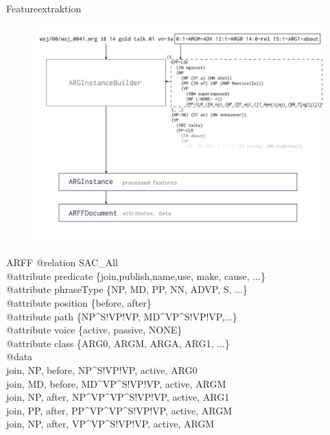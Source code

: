 \documentclass[10pt]{beamer}
\begin{document}
\begin{frame}{Featureextraktion} 
  \begin{figure}
	  \begin{center}
	  	\includegraphics[scale=0.5]{argext_graphic}
	  \end{center}
  \end{figure}
\end{frame}

\begin{frame}{ARFF}
	@relation SAC\_All \\
	\vspace{5pt}
	@attribute predicate \{join,publish,name,use, make, cause, ...\} \\
	@attribute phraseType \{NP, MD, PP, NN, ADVP, S, ...\} \\
	@attribute position \{before, after\} \\
	@attribute path \{NP\^{}S!VP!VP, MD\^{}VP\^{}S!VP!VP,...\} \\
	@attribute voice \{active, passive, NONE\} \\
	@attribute class \{ARG0, ARGM, ARGA, ARG1, ...\} \\
	\vspace{10pt}
	@data \\
	join, NP, before, NP\^{}S!VP!VP, active, ARG0 \\
	join, MD, before, MD\^{}VP\^{}S!VP!VP, active, ARGM \\
	join, NP, after, NP\^{}VP\^{}VP\^{}S!VP!VP, active, ARG1 \\
	join, PP, after, PP\^{}VP\^{}VP\^{}S!VP!VP, active, ARGM \\
	join, NP, after, VP\^{}VP\^{}S!VP!VP, active, ARGM \\

\end{frame}
\end{document}

